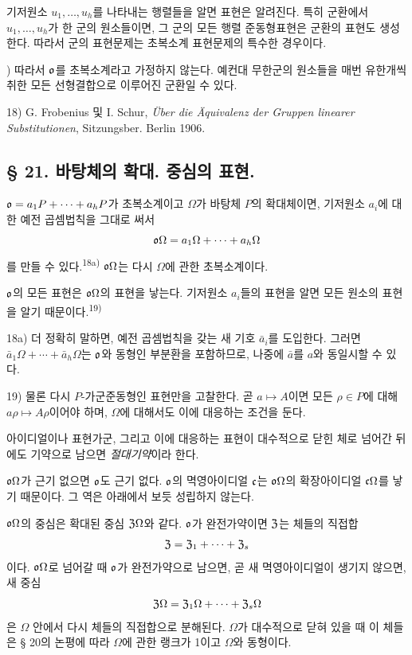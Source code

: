 기저원소 \(u_1,\ldots,u_h\)를 나타내는 행렬들을 알면 표현은 알려진다. 특히 군환에서 \(u_1,\ldots,u_h\)가 한 군의 원소들이면, 그 군의 모든 행렬 준동형표현은 군환의 표현도 생성한다. 따라서 군의 표현문제는 초복소계 표현문제의 특수한 경우이다.

{\footnotesize{}) 따라서 \(\mathfrak o\)를 초복소계라고 가정하지 않는다. 예컨대 무한군의 원소들을 매번 유한개씩 취한 모든 선형결합으로 이루어진 군환일 수 있다.\par
18) G. Frobenius 및 I. Schur, \emph{Über die Äquivalenz der Gruppen linearer Substitutionen}, Sitzungsber. Berlin 1906.\par}

\subsection*{§ 21. 바탕체의 확대. 중심의 표현.}

\(\mathfrak o=a_1P+\cdots+a_hP\)가 초복소계이고 \(\Omega\)가 바탕체 \(P\)의 확대체이면, 기저원소 \(a_i\)에 대한 예전 곱셈법칙을 그대로 써서
\[
        \mathfrak o\Omega=a_1\Omega+\cdots+a_h\Omega
\]
를 만들 수 있다.\textsuperscript{18a)} \(\mathfrak o\Omega\)는 다시 \(\Omega\)에 관한 초복소계이다.

\(\mathfrak o\)의 모든 표현은 \(\mathfrak o\Omega\)의 표현을 낳는다. 기저원소 \(a_i\)들의 표현을 알면 모든 원소의 표현을 알기 때문이다.\textsuperscript{19)}

{\footnotesize\noindent
18a) 더 정확히 말하면, 예전 곱셈법칙을 갖는 새 기호 \(\bar a_i\)를 도입한다. 그러면 \(\bar a_1\Omega+\cdots+\bar a_h\Omega\)는 \(\mathfrak o\)와 동형인 부분환을 포함하므로, 나중에 \(\bar a\)를 \(a\)와 동일시할 수 있다.\par
19) 물론 다시 \(P\)-가군준동형인 표현만을 고찰한다. 곧 \(a\mapsto A\)이면 모든 \(\rho\in P\)에 대해 \(a\rho\mapsto A\rho\)이어야 하며, \(\Omega\)에 대해서도 이에 대응하는 조건을 둔다.\par}

아이디얼이나 표현가군, 그리고 이에 대응하는 표현이 대수적으로 닫힌 체로 넘어간 뒤에도 기약으로 남으면 \emph{절대기약}이라 한다.

\(\mathfrak o\Omega\)가 근기 없으면 \(\mathfrak o\)도 근기 없다. \(\mathfrak o\)의 멱영아이디얼 \(\mathfrak c\)는 \(\mathfrak o\Omega\)의 확장아이디얼 \(\mathfrak c\Omega\)를 낳기 때문이다. 그 역은 아래에서 보듯 성립하지 않는다.

\(\mathfrak o\Omega\)의 중심은 확대된 중심 \(\mathfrak Z\Omega\)와 같다. \(\mathfrak o\)가 완전가약이면 \(\mathfrak Z\)는 체들의 직접합
\[
        \mathfrak Z=\mathfrak Z_1+\cdots+\mathfrak Z_s
\]
이다. \(\mathfrak o\Omega\)로 넘어갈 때 \(\mathfrak o\)가 완전가약으로 남으면, 곧 새 멱영아이디얼이 생기지 않으면, 새 중심
\[
        \mathfrak Z\Omega=\mathfrak Z_1\Omega+\cdots+\mathfrak Z_s\Omega
\]
은 \(\Omega\) 안에서 다시 체들의 직접합으로 분해된다. \(\Omega\)가 대수적으로 닫혀 있을 때 이 체들은 § 20의 논평에 따라 \(\Omega\)에 관한 랭크가 1이고 \(\Omega\)와 동형이다.

